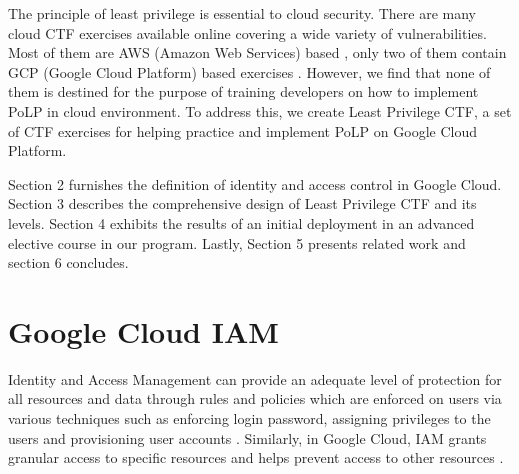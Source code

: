 \documentclass[sigconf]{acmart}
\begin{document}
The principle of least privilege is essential to cloud security. There are many cloud CTF exercises available online covering a wide variety of vulnerabilities. Most of them are AWS (Amazon Web Services) based \cite{flaws} \cite{flaws2} \cite{cloudgoat} \cite{serverlessgoat}, only two of them contain  GCP (Google Cloud Platform) based exercises \cite{thunder-ctf} \cite{QWIKLABS}.  However, we find that none of them is destined for the purpose of training developers on how to implement PoLP in cloud environment. To address this, we create Least Privilege CTF, a set of CTF exercises for helping practice and implement PoLP on Google Cloud Platform.

Section 2 furnishes the definition of identity and access control in Google Cloud. Section 3 describes the comprehensive design of Least Privilege CTF and its levels. Section 4 exhibits the results of an initial deployment in an advanced elective course in our program. Lastly, Section 5 presents related work and section 6 concludes.


\section{Google Cloud IAM}
Identity and Access Management can provide an adequate level of protection for all resources and data through rules and policies which are enforced on users via various techniques such as enforcing login password, assigning privileges to the users and provisioning user accounts \cite{AlmullaSameeraAbdulrahmanandYeun2010}.
Similarly, in Google Cloud, IAM grants granular access to specific resources and helps prevent access to other resources \cite{Googlecloudiam}.
\end{document}
